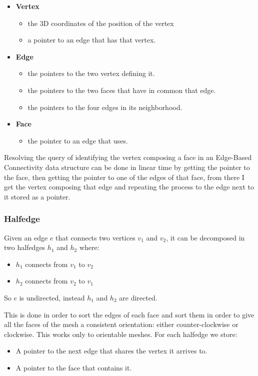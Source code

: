 \begin{itemize}
    \item \textbf{Vertex}
        \begin{itemize}
            \item the 3D coordinates of the position of the vertex
            \item a pointer to an edge that has that vertex.
        \end{itemize}
    \item \textbf{Edge}
        \begin{itemize}
            \item the pointers to the two vertex defining it.
            \item the pointers to the two faces that have in common that edge.
            \item the pointers to the four edges in its neighborhood.
        \end{itemize}
    \item \textbf{Face}
        \begin{itemize}
            \item the pointer to an edge that uses.
        \end{itemize}
\end{itemize}

Resolving the query of identifying the vertex composing a face in an Edge-Based Connectivity data structure can be done in linear time by getting the pointer to the face, then getting the pointer to one of the edges of that face, from there I get the vertex composing that edge and repeating the process to the edge next to it stored as a pointer.

\subsubsection{Halfedge}
Given an edge $e$ that connects two vertices $v_{1}$ and $v_{2}$, it can be decomposed in two halfedges $h_{1}$ and $h_{2}$ where:
\begin{itemize}
    \item $h_{1}$ connects from $v_{1}$ to $v_{2}$
    \item $h_{2}$ connects from $v_{2}$ to $v_{1}$
\end{itemize}
So $e$ is undirected, instead $h_{1}$ and $h_{2}$ are directed.\par
This is done in order to sort the edges of each face and sort them in order to give all the faces of the mesh a consistent orientation: either counter-clockwise or clockwise. This works only to orientable meshes. For each halfedge we store:
\begin{itemize}
    \item A pointer to the next edge that shares the vertex it arrives to.
    \item A pointer to the face that contains it.
\end{itemize}


